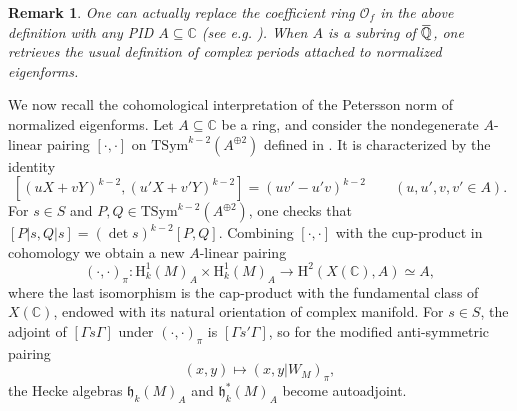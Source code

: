 \documentclass[12pt]{amsart}
\newcommand\bC{\mathbb{C}}
\newcommand\bQ{\mathbb{Q}}
\newcommand\cO{\mathcal{O}}
\newcommand\gh{\mathfrak{h}}
\newcommand{\ob}[1]{\mkern 1.5mu\overline{\mkern-1.5mu#1\mkern-1.5mu}\mkern 1.5mu}
\newcommand{\HH}{\mathrm{H}}
\theoremstyle{defstyle}
\newtheorem{remark}[subsubsection]{Remark}
\theoremstyle{thmstyle}
\begin{document}
\begin{remark}
	One can actually replace the coefficient ring $\cO_f$ in the above definition with any PID $A\subseteq \bC$ (see e.g. \cite[Rem. 5.4.10]{eigenbook}). When $A$ is a subring of $\ob{\bQ}$, one retrieves the usual definition of complex periods attached to normalized eigenforms.
\end{remark}

We now recall the cohomological interpretation of the Petersson norm of normalized eigenforms. Let $A\subseteq \bC$ be a ring, and consider the nondegenerate $A$-linear pairing $[\cdot,\cdot]$ on $\textrm{TSym}^{k-2}(A^{\oplus 2})$ defined in \cite[(4.2.1)]{ohtacrelle}. It is characterized by the identity 
\[[(uX+vY)^{k-2},(u'X+v'Y)^{k-2}]=(uv'-u'v)^{k-2} \qquad (u,u',v,v'\in A).\]
For $s\in S$ and $P,Q\in \textrm{TSym}^{k-2}(A^{\oplus 2})$, one checks that $[P|s,Q|s]=(\det s)^{k-2}[P,Q]$. Combining $[\cdot,\cdot]$ with the cup-product in cohomology we obtain a new $A$-linear pairing 
\begin{equation}
	(\cdot,\cdot)_\pi \colon \HH^1_k(M)_A \times \HH^1_k(M)_A \to \HH^2(X(\bC),A) \simeq A,
\end{equation}
where the last isomorphism is the cap-product with the fundamental class of $X(\bC)$, endowed with its natural orientation of complex manifold. For $s\in S$, the adjoint of $[\Gamma s \Gamma]$ under $	(\cdot,\cdot)_\pi$ is $[\Gamma s' \Gamma]$, so for the modified anti-symmetric pairing 
\begin{equation}\label{eq:modified_pairing}
	(x,y) \mapsto (x,y|W_M)_\pi,
\end{equation}
the Hecke algebras $\gh_k(M)_A$ and $\gh^*_k(M)_A$ become autoadjoint.
\end{document}
